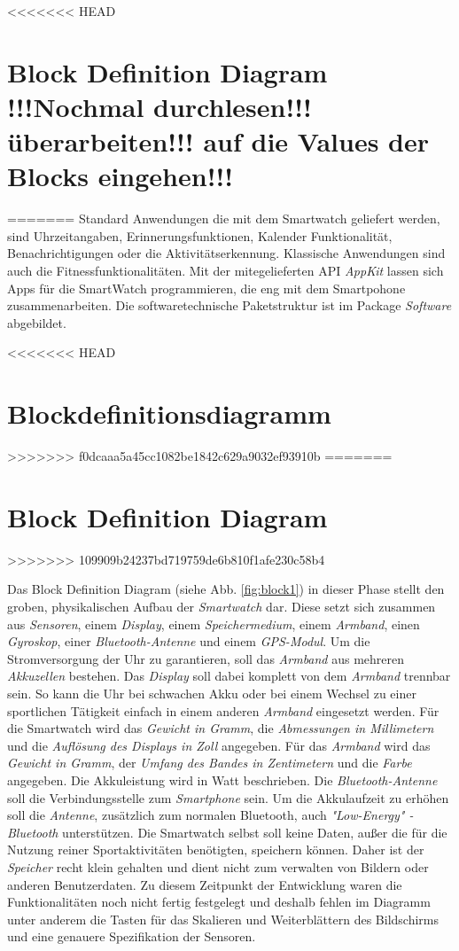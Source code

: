 <<<<<<< HEAD
\section{Block Definition Diagram !!!Nochmal durchlesen!!!überarbeiten!!! auf die Values der Blocks eingehen!!!}
=======
Standard Anwendungen die mit dem Smartwatch geliefert werden, sind Uhrzeitangaben, Erinnerungsfunktionen, Kalender Funktionalität, Benachrichtigungen oder die Aktivitätserkennung. Klassische Anwendungen sind auch die Fitnessfunktionalitäten.
Mit der mitegelieferten API \textit{AppKit} lassen sich Apps für die SmartWatch programmieren, die eng mit dem Smartpohone zusammenarbeiten.
Die softwaretechnische Paketstruktur ist im Package \textit{Software} abgebildet.

<<<<<<< HEAD
\section{Blockdefinitionsdiagramm}
>>>>>>> f0dcaaa5a45cc1082be1842c629a9032ef93910b
=======
\section{Block Definition Diagram}
>>>>>>> 109909b24237bd719759de6b810f1afe230c58b4

Das Block Definition Diagram (siehe Abb. \ref{fig:block1}) in dieser Phase stellt den groben, physikalischen Aufbau der \textit{Smartwatch} dar. Diese setzt sich zusammen aus \textit{Sensoren}, einem \textit{Display}, einem \textit{Speichermedium}, einem \textit{Armband}, einen \textit{Gyroskop}, einer \textit{Bluetooth-Antenne} und einem \textit{GPS-Modul}. Um die Stromversorgung der Uhr zu garantieren, soll das \textit{Armband} aus mehreren \textit{Akkuzellen} bestehen. Das \textit{Display} soll dabei komplett von dem \textit{Armband} trennbar sein. So kann die Uhr bei schwachen Akku oder bei einem Wechsel zu einer sportlichen Tätigkeit einfach in einem anderen \textit{Armband} eingesetzt werden. Für die Smartwatch wird das \textit{Gewicht in Gramm}, die \textit{Abmessungen in Millimetern} und die \textit{Auflösung des Displays in Zoll} angegeben. Für das \textit{Armband} wird das \textit{Gewicht in Gramm}, der \textit{Umfang des Bandes in Zentimetern} und die \textit{Farbe} angegeben. Die Akkuleistung wird in Watt beschrieben. Die \textit{Bluetooth-Antenne} soll die Verbindungsstelle zum \textit{Smartphone} sein. Um die Akkulaufzeit zu erhöhen soll die \textit{Antenne}, zusätzlich zum normalen Bluetooth, auch \textit{"Low-Energy" -Bluetooth} unterstützen. Die Smartwatch selbst soll keine Daten, außer die für die Nutzung reiner Sportaktivitäten benötigten, speichern können. Daher ist der \textit{Speicher} recht klein gehalten und dient nicht zum verwalten von Bildern oder anderen Benutzerdaten.
Zu diesem Zeitpunkt der Entwicklung waren die Funktionalitäten noch nicht fertig festgelegt und deshalb fehlen im Diagramm unter anderem die Tasten für das Skalieren und Weiterblättern des Bildschirms und eine genauere Spezifikation der Sensoren.

